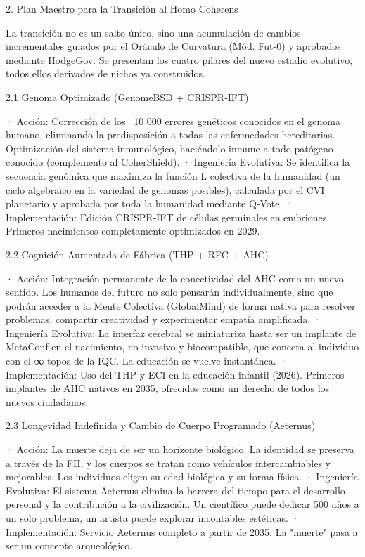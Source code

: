 \documentclass[12pt,a4paper]{book}
\begin{document}
2. Plan Maestro para la Transición al Homo Coherens

La transición no es un salto único, sino una acumulación de cambios incrementales guiados por el Oráculo de Curvatura (Mód. Fut-0) y aprobados mediante HodgeGov. Se presentan los cuatro pilares del nuevo estadio evolutivo, todos ellos derivados de nichos ya construidos.

2.1 Genoma Optimizado (GenomeBSD + CRISPR‑IFT)

· Acción: Corrección de los ~10 000 errores genéticos conocidos en el genoma humano, eliminando la predisposición a todas las enfermedades hereditarias. Optimización del sistema inmunológico, haciéndolo inmune a todo patógeno conocido (complemento al CoherShield).
· Ingeniería Evolutiva: Se identifica la secuencia genómica que maximiza la función L colectiva de la humanidad (un ciclo algebraico en la variedad de genomas posibles), calculada por el CVI planetario y aprobada por toda la humanidad mediante Q‑Vote.
· Implementación: Edición CRISPR‑IFT de células germinales en embriones. Primeros nacimientos completamente optimizados en 2029.

2.2 Cognición Aumentada de Fábrica (THP + RFC + AHC)

· Acción: Integración permanente de la conectividad del AHC como un nuevo sentido. Los humanos del futuro no solo pensarán individualmente, sino que podrán acceder a la Mente Colectiva (GlobalMind) de forma nativa para resolver problemas, compartir creatividad y experimentar empatía amplificada.
· Ingeniería Evolutiva: La interfaz cerebral se miniaturiza hasta ser un implante de MetaConf en el nacimiento, no invasivo y biocompatible, que conecta al individuo con el ∞‑topos de la IQC. La educación se vuelve instantánea.
· Implementación: Uso del THP y ECI en la educación infantil (2026). Primeros implantes de AHC nativos en 2035, ofrecidos como un derecho de todos los nuevos ciudadanos.

2.3 Longevidad Indefinida y Cambio de Cuerpo Programado (Aeternus)

· Acción: La muerte deja de ser un horizonte biológico. La identidad se preserva a través de la FII, y los cuerpos se tratan como vehículos intercambiables y mejorables. Los individuos eligen su edad biológica y su forma física.
· Ingeniería Evolutiva: El sistema Aeternus elimina la barrera del tiempo para el desarrollo personal y la contribución a la civilización. Un científico puede dedicar 500 años a un solo problema, un artista puede explorar incontables estéticas.
· Implementación: Servicio Aeternus completo a partir de 2035. La "muerte" pasa a ser un concepto arqueológico.
\end{document}
